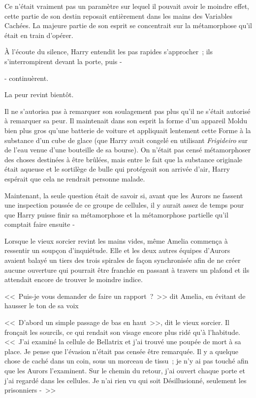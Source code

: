 Ce n'était vraiment pas un paramètre sur lequel il pouvait avoir le moindre effet, cette partie de son destin reposait entièrement dans les mains des Variables Cachées. La majeure partie de son esprit se concentrait sur la métamorphose qu'il était en train d'opérer.

À l'écoute du silence, Harry entendit les pas rapides s'approcher~; ils s'interrompirent devant la porte, puis -

- continuèrent.

La peur revint bientôt.

Il ne s'autorisa pas à remarquer son soulagement pas plus qu'il ne s'était autorisé à remarquer sa peur. Il maintenait dans son esprit la forme d'un appareil Moldu bien plus gros qu'une batterie de voiture et appliquait lentement cette Forme à la substance d'un cube de glace (que Harry avait congelé en utilisant \emph{Frigideiro} sur de l'eau venue d'une bouteille de sa bourse). On n'était pas censé métamorphoser des choses destinées à être brûlées, mais entre le fait que la substance originale était aqueuse et le sortilège de bulle qui protégeait son arrivée d'air, Harry espérait que cela ne rendrait personne malade.

Maintenant, la seule question était de savoir si, avant que les Aurors ne fassent une inspection poussée de ce groupe de cellules, il y aurait assez de temps pour que Harry puisse finir sa métamorphose et la métamorphose partielle qu'il comptait faire ensuite -

\later

Lorsque le vieux sorcier revint les mains vides, même Amelia commença à ressentir un soupçon d'inquiétude. Elle et les deux autres équipes d'Aurors avaient balayé un tiers des trois spirales de façon synchronisée afin de ne créer aucune ouverture qui pourrait être franchie en passant à travers un plafond et ils attendait encore de trouver le moindre indice.

<<~Puis-je vous demander de faire un rapport~?~>> dit Amelia, en évitant de hausser le ton de sa voix

<<~D'abord un simple passage de bas en haut~>>, dit le vieux sorcier. Il fronçait les sourcils, ce qui rendait son visage encore plus ridé qu'à l'habitude. <<~J'ai examiné la cellule de Bellatrix et j'ai trouvé une poupée de mort à sa place. Je pense que l'évasion n'était pas censée être remarquée. Il y a quelque chose de caché dans un coin, sous un morceau de tissu~; je n'y ai pas touché afin que les Aurors l'examinent. Sur le chemin du retour, j'ai ouvert chaque porte et j'ai regardé dans les cellules. Je n'ai rien vu qui soit Désillusionné, seulement les prisonniers -~>>

